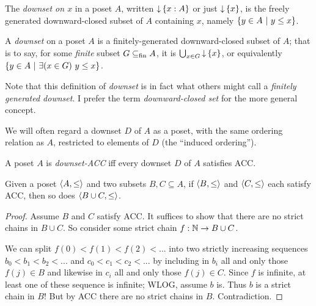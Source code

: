 \documentclass{article}
\begin{document}
\begin{definition}
  The \emph{downset on $x$} in a poset $A$, written ${\downarrow}\,\{x : A\}$ or just
  ${\downarrow}\,\{x\}$, is the freely generated downward-closed subset of $A$
  containing $x$, namely $\{{y \in A}~|~{y \le x}\}$.
\end{definition}

\begin{definition}[Downset]
  A \emph{downset} on a poset $A$ is a finitely-generated downward-closed subset
  of $A$; that is to say, for some \emph{finite} subset $G \subseteq_{\text{fin}} A$, it
  is $\bigcup_{x \in G} {\downarrow}\,\{x\}$, or equivalently $\{{y \in
    A}~|~{\exists(x \in G)\ y \le x}\}$.
\end{definition}

Note that this definition of \emph{downset} is in fact what others might call a
\emph{finitely generated downset}. I prefer the term \emph{downward-closed set}
for the more general concept.

We will often regard a downset $D$ of $A$ as a poset, with the same ordering
relation as $A$, restricted to elements of $D$ (the ``induced ordering'').

\begin{definition}
  A poset $A$ is \emph{downset-ACC} iff every downset $D$ of $A$ satisfies
  ACC.
\end{definition}

\begin{lemma}\label{lemma:acc-union}
  Given a poset $\langle{A,\le}\rangle$ and two subsets $B,C \subseteq A$, if
  $\langle{B,\le}\rangle$ and $\langle{C,\le}\rangle$ each satisfy ACC, then so does $\langle{B
    \cup C, \le}\rangle$.
\end{lemma}
\begin{proof}
  Assume $B$ and $C$ satisfy ACC.
  It suffices to show that there are no strict chains in $B \cup C$.
  So consider some strict chain $f : \mathbb{N} \to B \cup C$.

  We can split $f(0) < f(1) < f(2) < ...$ into two strictly increasing sequences
  $b_0 < b_1 < b_2 < ...$ and $c_0 < c_1 < c_2 < ...$ by including in $b_i$ all
  and only those $f(j) \in B$ and likewise in $c_i$ all and only those $f(j) \in
  C$. Since $f$ is infinite, at least one of these sequence is infinite; WLOG,
  assume $b$ is. Thus $b$ is a strict chain in $B$! But by ACC there are no
  strict chains in $B$. Contradiction.
\end{proof}
\end{document}
